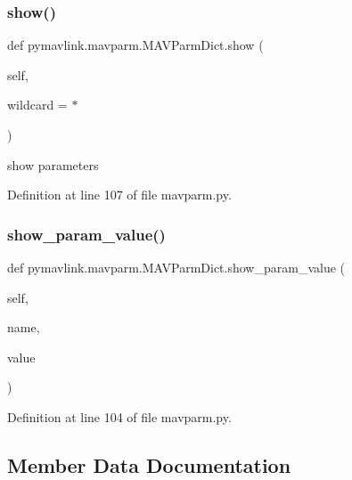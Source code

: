 \subsubsection{\texorpdfstring{show()}{show()}}
{\footnotesize\ttfamily def pymavlink.\+mavparm.\+M\+A\+V\+Parm\+Dict.\+show (\begin{DoxyParamCaption}\item[{}]{self,  }\item[{}]{wildcard = {\ttfamily \textquotesingle{}$\ast$\textquotesingle{}} }\end{DoxyParamCaption})}

\begin{DoxyVerb}show parameters\end{DoxyVerb}
 

Definition at line 107 of file mavparm.\+py.

\mbox{\label{classpymavlink_1_1mavparm_1_1MAVParmDict_af2060e1b0249698bb61e841c1e923fb5}} 
\subsubsection{\texorpdfstring{show\_param\_value()}{show\_param\_value()}}
{\footnotesize\ttfamily def pymavlink.\+mavparm.\+M\+A\+V\+Parm\+Dict.\+show\+\_\+param\+\_\+value (\begin{DoxyParamCaption}\item[{}]{self,  }\item[{}]{name,  }\item[{}]{value }\end{DoxyParamCaption})}



Definition at line 104 of file mavparm.\+py.



\subsection{Member Data Documentation}
\mbox{\label{classpymavlink_1_1mavparm_1_1MAVParmDict_a50e24dfc2d1005d14f1a2aeaf973b81f}} 
